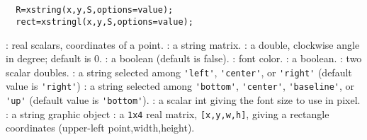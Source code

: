 
\begin{mandesc}
   \\
   \\
\end{mandesc}
\begin{calling_sequence}
\begin{verbatim}
  R=xstring(x,y,S,options=value);
  rect=xstringl(x,y,S,options=value);
\end{verbatim}
\end{calling_sequence}
\begin{parameters}
  \begin{varlist}
    : real scalars, coordinates of a point.
    : a string matrix.
    : a double, clockwise angle in degree; default is 0.
    : a boolean (default is false).
    : font color.
    : a boolean.
    : two scalar doubles.
    : a string selected among \verb!'left'!, \verb!'center'!, or \verb!'right'! (default value is \verb!'right'!)
    : a string selected among \verb!'bottom'!, \verb!'center'!, \verb!'baseline'!, or \verb!'up'! (default value is \verb!'bottom'!).
    : a scalar int giving the font size to use in pixel.
    : a string graphic object
    : a \verb!1x4! real matrix, \verb![x,y,w,h]!, giving a rectangle coordinates (upper-left point,width,height).
  \end{varlist}
\end{parameters}

